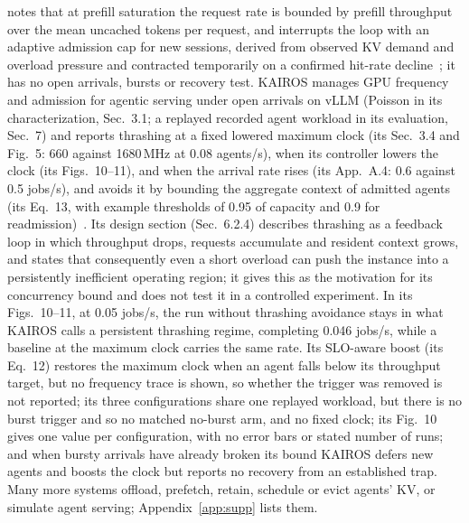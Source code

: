 notes that at prefill saturation the request rate is bounded by prefill throughput over the mean uncached tokens per request, and interrupts the loop with an adaptive admission cap for new sessions, derived from observed KV demand and overload pressure and contracted temporarily on a confirmed hit-rate decline~\citep{hong2026misat}; it has no open arrivals, bursts or recovery test. KAIROS manages GPU frequency and admission for agentic serving under open arrivals on vLLM (Poisson in its characterization, Sec.~3.1; a replayed recorded agent workload in its evaluation, Sec.~7) and reports thrashing at a fixed lowered maximum clock (its Sec.~3.4 and Fig.~5: 660 against 1680\,MHz at 0.08 agents/s), when its controller lowers the clock (its Figs.~10--11), and when the arrival rate rises (its App.~A.4: 0.6 against 0.5 jobs/s), and avoids it by bounding the aggregate context of admitted agents (its Eq.~13, with example thresholds of 0.95 of capacity and 0.9 for readmission)~\citep{yuan2026kairos}. Its design section (Sec.~6.2.4) describes thrashing as a feedback loop in which throughput drops, requests accumulate and resident context grows, and states that consequently even a short overload can push the instance into a persistently inefficient operating region; it gives this as the motivation for its concurrency bound and does not test it in a controlled experiment. In its Figs.~10--11, at 0.05 jobs/s, the run without thrashing avoidance stays in what KAIROS calls a persistent thrashing regime, completing 0.046 jobs/s, while a baseline at the maximum clock carries the same rate. Its SLO-aware boost (its Eq.~12) restores the maximum clock when an agent falls below its throughput target, but no frequency trace is shown, so whether the trigger was removed is not reported; its three configurations share one replayed workload, but there is no burst trigger and so no matched no-burst arm, and no fixed clock; its Fig.~10 gives one value per configuration, with no error bars or stated number of runs; and when bursty arrivals have already broken its bound KAIROS defers new agents and boosts the clock but reports no recovery from an established trap. Many more systems offload, prefetch, retain, schedule or evict agents' KV, or simulate agent serving; Appendix~\ref{app:supp} lists them.

